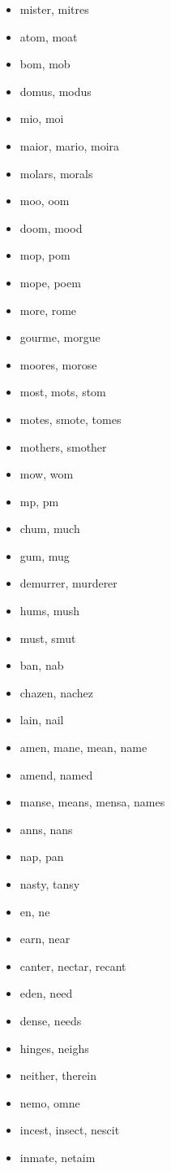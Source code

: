 \documentclass[a4wide,11pt]{report}
\begin{document}
\begin{itemize}
  \item mister, mitres
  \item atom, moat
  \item bom, mob
  \item domus, modus
  \item mio, moi
  \item maior, mario, moira
  \item molars, morals
  \item moo, oom
  \item doom, mood
  \item mop, pom
  \item mope, poem
  \item more, rome
  \item gourme, morgue
  \item moores, morose
  \item most, mots, stom
  \item motes, smote, tomes
  \item mothers, smother
  \item mow, wom
  \item mp, pm
  \item chum, much
  \item gum, mug
  \item demurrer, murderer
  \item hums, mush
  \item must, smut
  \item ban, nab
  \item chazen, nachez
  \item lain, nail
  \item amen, mane, mean, name
  \item amend, named
  \item manse, means, mensa, names
  \item anns, nans
  \item nap, pan
  \item nasty, tansy
  \item en, ne
  \item earn, near
  \item canter, nectar, recant
  \item eden, need
  \item dense, needs
  \item hinges, neighs
  \item neither, therein
  \item nemo, omne
  \item incest, insect, nescit
  \item inmate, netaim

\end{itemize}
\end{document}

